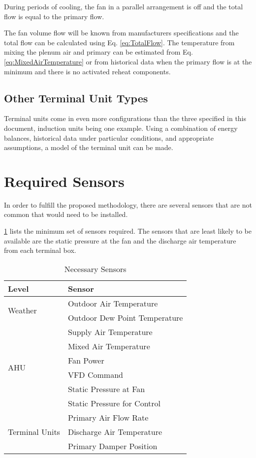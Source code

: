 During periods of cooling, the fan in a parallel arrangement is off and the total flow is equal to the primary flow.

The fan volume flow will be known from manufacturers specifications and the total flow can be calculated using Eq. \eqref{eq:TotalFlow}. The temperature from mixing the plenum air and primary can be estimated from Eq. \eqref{eq:MixedAirTemperature} or from historical data when the primary flow is at the minimum and there is no activated reheat components.

\subsection{Other Terminal Unit Types}

Terminal units come in even more configurations than the three specified in this document, induction units being one example. Using a combination of energy balances, historical data under particular conditions, and appropriate assumptions, a model of the terminal unit can be made. 

\section{Required Sensors}

In order to fulfill the proposed methodology, there are several sensors that are not common that would need to be installed. 

\tableref{} \ref{tab:NecessarySensors} lists the minimum set of sensors required. The sensors that are least likely to be available are the static pressure at the fan and the discharge air temperature from each terminal box.

\begin{table}
\centering
\begin{tabular}{l l}
\toprule

Level & Sensor \\
\midrule\midrule
\multirow{2}{*}{Weather} & Outdoor Air Temperature \\
 & Outdoor Dew Point Temperature \\
 
 \midrule
 
 \multirow{6}{*}{AHU} & Supply Air Temperature \\
 & Mixed Air Temperature \\
 & Fan Power \\
 & VFD Command \\
 & Static Pressure at Fan \\
 & Static Pressure for Control \\
 
 
\midrule
\multirow{4}{*}{Terminal Units} & Primary Air Flow Rate \\
& Discharge Air Temperature \\
& Primary Damper Position \\

\bottomrule

\end{tabular}
\caption{Necessary Sensors}
\label{tab:NecessarySensors}
\end{table}

